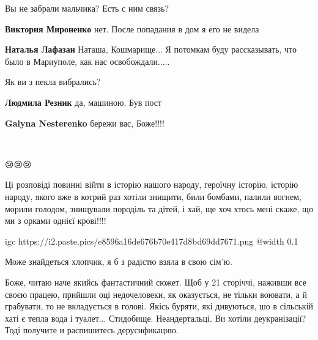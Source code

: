  
 
 
 
 

\qqSecCmt


Вы не забрали мальчика? Есть с ним связь?

\begin{itemize} %
\textbf{Виктория Мироненко} нет. После попадания в дом я его не видела

\textbf{Наталья Лафазан} Наташа, Кошмарище... Я потомкам буду рассказывать, что было в Мариуполе, как нас освобождали.....
\end{itemize} %


Як ви з пекла вибрались?

\begin{itemize} %
\textbf{Людмила Резник} да, машиною. Був пост

\textbf{Galyna Nesterenko} бережи вас, Боже!!!!
\end{itemize} %

🙏

😢😢😢🙏🙏🙏


Ці розповіді повинні війти в історію нашого народу, героїчну історію, історію
народу, якого вже в котрий раз хотіли знищити, били бомбами, палили вогнем, морили
голодом, знищували породіль та дітей, і хай, ще хоч хтось мені скаже, що ми з
орками однієї крові!!!!


\ifcmt
  igc https://i2.paste.pics/e8596a16de676b70e417d8bd69dd7671.png
	@width 0.1
\fi


Може знайдеться хлопчик, я б з радістю взяла в свою сім'ю.


Боже, читаю наче якийсь фантастичний сюжет. Щоб у 21 сторіччі, наживши все
своєю працею, прийшли оці недочеловеки, як оказується, не тільки воювати, а й
грабувати, то не вкладується в голові. Якісь буряти, які дивуються, шо в
сільській хаті є тепла вода і туалет... Стидобище. Неандертальці. Ви хотіли
деукранізації? Тоді получите и распишитесь дерусификацию.


